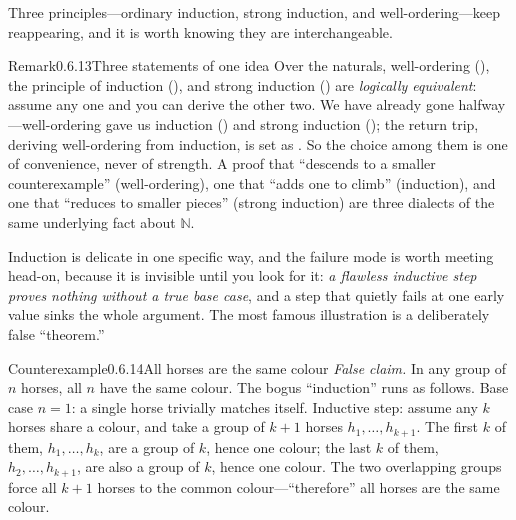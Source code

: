 \documentclass[main.tex]{subfiles}
\begin{document}
\noindent Three principles---ordinary induction, strong induction, and well-ordering---keep
reappearing, and it is worth knowing they are interchangeable.

\begin{ObjL}{Remark}{0.6.13}{Three statements of one idea}
Over the naturals, well-ordering (), the principle of induction (), and strong
induction () are \emph{logically equivalent}: assume any one and you can derive the other
two. We have already gone halfway---well-ordering gave us induction () and strong
induction (); the return trip, deriving well-ordering from induction, is set as
. So the choice among them is one of convenience, never of strength. A proof that
``descends to a smaller counterexample'' (well-ordering), one that ``adds one to climb'' (induction),
and one that ``reduces to smaller pieces'' (strong induction) are three dialects of the same
underlying fact about $\mathbb N$.
\end{ObjL}

\noindent Induction is delicate in one specific way, and the failure mode is worth meeting head-on,
because it is invisible until you look for it: \emph{a flawless inductive step proves nothing without a
true base case}, and a step that quietly fails at one early value sinks the whole argument. The most
famous illustration is a deliberately false ``theorem.''

\begin{Obj}{Counterexample}{0.6.14}{All horses are the same colour}
\emph{False claim.} In any group of $n$ horses, all $n$ have the same colour. The bogus ``induction''
runs as follows. Base case $n=1$: a single horse trivially matches itself. Inductive step: assume any
$k$ horses share a colour, and take a group of $k+1$ horses $h_1,\dots,h_{k+1}$. The first $k$ of them,
$h_1,\dots,h_k$, are a group of $k$, hence one colour; the last $k$ of them, $h_2,\dots,h_{k+1}$, are
also a group of $k$, hence one colour. The two overlapping groups force all $k+1$ horses to the common
colour---``therefore'' all horses are the same colour.
\end{Obj}
\end{document}
